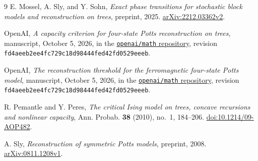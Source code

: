 \begin{thebibliography}{9}
E. Mossel, A. Sly, and Y. Sohn,
\emph{Exact phase transitions for stochastic block models and reconstruction
on trees}, preprint, 2025.
\href{https://arxiv.org/abs/2212.03362v2}{arXiv:2212.03362v2}.

OpenAI,
\emph{A capacity criterion for four-state Potts reconstruction on trees},
manuscript, October 5, 2026, in the
\href{https://github.com/openai/math/tree/fd4aeeb2ee4fc729c18d98444fed42fd0529eeeb/preprints/A-Capacity-Criterion-for-Four-State-Potts-Reconstruction-on-Trees-October-5-2026}{\texttt{openai/math} repository},
revision \texttt{fd4aeeb2ee4fc729c18d98444fed42fd0529eeeb}.

OpenAI,
\emph{The reconstruction threshold for the ferromagnetic four-state Potts
model}, manuscript, October 5, 2026, in the
\href{https://github.com/openai/math/tree/fd4aeeb2ee4fc729c18d98444fed42fd0529eeeb/preprints/The-Reconstruction-Threshold-for-the-Ferromagnetic-Four-State-Potts-Model-October-5-2026}{\texttt{openai/math} repository},
revision \texttt{fd4aeeb2ee4fc729c18d98444fed42fd0529eeeb}.

R. Pemantle and Y. Peres,
\emph{The critical Ising model on trees, concave recursions and nonlinear
capacity}, Ann. Probab. \textbf{38} (2010), no.~1, 184--206.
\href{https://doi.org/10.1214/09-AOP482}{doi:10.1214/09-AOP482}.

A. Sly,
\emph{Reconstruction of symmetric Potts models}, preprint, 2008.
\href{https://arxiv.org/abs/0811.1208v1}{arXiv:0811.1208v1}.
\end{thebibliography}
